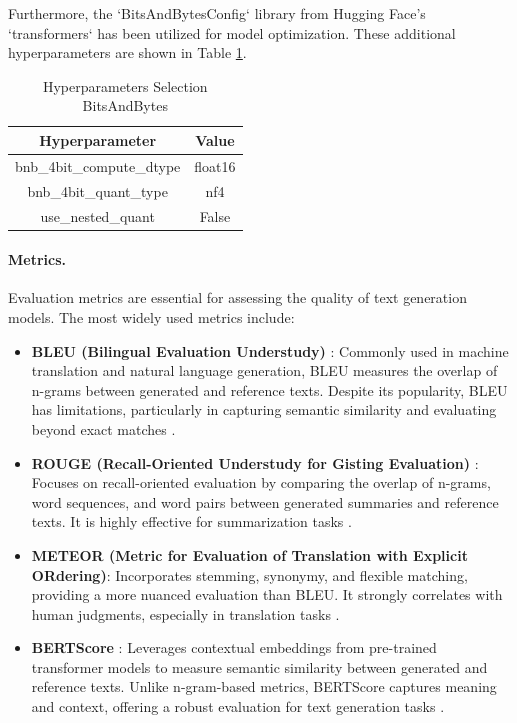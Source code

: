 Furthermore, the `BitsAndBytesConfig` library from Hugging Face's `transformers` has been utilized for model optimization. These additional hyperparameters are shown in Table \ref{table:hyperparameters-bitsandbytes}.
\begin{table}[H]
    \centering
    \begin{tabular}{|c|c|}
        \hline
        \textbf{Hyperparameter} & \textbf{Value} \\
        \hline
        bnb\_4bit\_compute\_dtype & float16 \\
        bnb\_4bit\_quant\_type & nf4 \\
        use\_nested\_quant & False \\
        \hline
    \end{tabular}
    \caption{Hyperparameters Selection BitsAndBytes}
    \label{table:hyperparameters-bitsandbytes}
\end{table}

\paragraph{Metrics.} Evaluation metrics are essential for assessing the quality of text generation models. The most widely used metrics include: 

\begin{itemize} 
    \item \textbf{BLEU (Bilingual Evaluation Understudy)} \cite{Papineni02bleu:a}: Commonly used in machine translation and natural language generation, BLEU measures the overlap of n-grams between generated and reference texts. Despite its popularity, BLEU has limitations, particularly in capturing semantic similarity and evaluating beyond exact matches \cite{Reiter2018A}. 
    \item \textbf{ROUGE (Recall-Oriented Understudy for Gisting Evaluation)} \cite{lin-2004-rouge}: Focuses on recall-oriented evaluation by comparing the overlap of n-grams, word sequences, and word pairs between generated summaries and reference texts. It is highly effective for summarization tasks \cite{Ganesan2015ROUGE}.
    \item \textbf{METEOR (Metric for Evaluation of Translation with Explicit ORdering)}\cite{10.5555/1626355.1626389}: Incorporates stemming, synonymy, and flexible matching, providing a more nuanced evaluation than BLEU. It strongly correlates with human judgments, especially in translation tasks \cite{Dobre2015ACB}. 
    \item \textbf{BERTScore} \cite{zhang2020bertscoreevaluatingtextgeneration}: Leverages contextual embeddings from pre-trained transformer models to measure semantic similarity between generated and reference texts. Unlike n-gram-based metrics, BERTScore captures meaning and context, offering a robust evaluation for text generation tasks \cite{zhang2020bertscoreevaluatingtextgeneration}.
\end{itemize}

